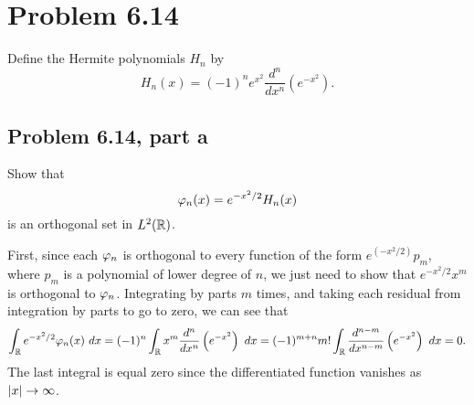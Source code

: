 \newpage
\section{Problem 6.14}
Define the Hermite polynomials $H_n$ by 
\[H_n(x) = (-1)^ne^{x^2} \frac{d^n}{dx^n}\left( e^{-x^2}\right).\]
\subsection{Problem 6.14, part a}
Show that 
\[\varphi_n(x)  = e^{-x^2/2}H_n(x)\]
is an orthogonal set in $L^2(\mathbb{R})$.
\partbreak
\begin{solution}

    First, since each $\varphi_n$ is orthogonal to every function of the form $e^{(-x^2/2)}p_m$, where $p_m$ is a polynomial of lower degree of $n$, we just need to show that $e^{-x^2/2}x^m$ is orthogonal to $\varphi_n$. Integrating by parts $m$ times, and taking each residual from integration by parts to go to zero, we can see that
    \[\int_{\mathbb{R}} e^{-x^2/2}\varphi_n(x) \ dx = (-1)^n\int_{\mathbb{R}} x^m \frac{d^n}{dx^n} \left( e^{-x^2}\right) \ dx = (-1)^{m+n}m!\int_{\mathbb{R}} \frac{d^{n-m}}{dx^{n-m}}\left(e^{-x^2}\right) \ dx = 0.\]
    The last integral is equal zero since the differentiated function vanishes as $|x| \rightarrow \infty$.
\end{solution}

\newpage
